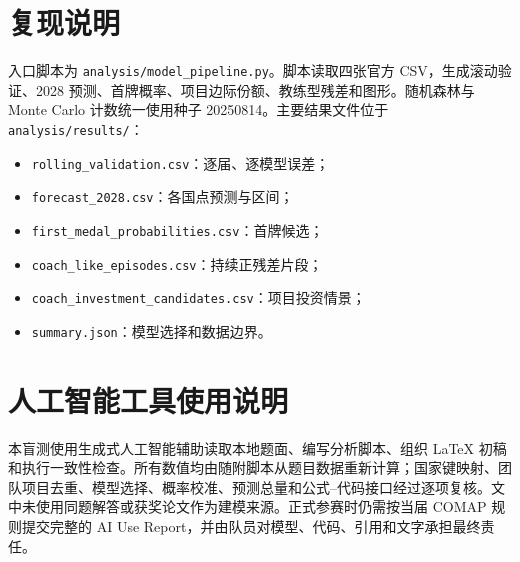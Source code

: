 \documentclass[UTF8,11pt,a4paper]{ctexart}
\begin{document}
\appendix
\section{复现说明}

入口脚本为 \texttt{analysis/model\_pipeline.py}。脚本读取四张官方 CSV，生成滚动验证、2028 预测、首牌概率、项目边际份额、教练型残差和图形。随机森林与 Monte Carlo 计数统一使用种子 20250814。主要结果文件位于 \texttt{analysis/results/}：
\begin{itemize}
\item \texttt{rolling\_validation.csv}：逐届、逐模型误差；
\item \texttt{forecast\_2028.csv}：各国点预测与区间；
\item \texttt{first\_medal\_probabilities.csv}：首牌候选；
\item \texttt{coach\_like\_episodes.csv}：持续正残差片段；
\item \texttt{coach\_investment\_candidates.csv}：项目投资情景；
\item \texttt{summary.json}：模型选择和数据边界。
\end{itemize}

\section{人工智能工具使用说明}

本盲测使用生成式人工智能辅助读取本地题面、编写分析脚本、组织 LaTeX 初稿和执行一致性检查。所有数值均由随附脚本从题目数据重新计算；国家键映射、团队项目去重、模型选择、概率校准、预测总量和公式--代码接口经过逐项复核。文中未使用同题解答或获奖论文作为建模来源。正式参赛时仍需按当届 COMAP 规则提交完整的 AI Use Report，并由队员对模型、代码、引用和文字承担最终责任。
\end{document}
